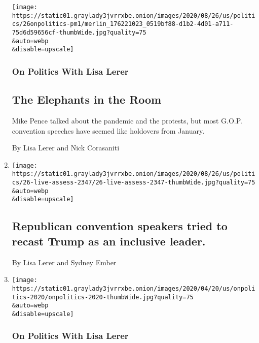 \begin{enumerate}
  \texttt{[image: https://static01.graylady3jvrrxbe.onion/images/2020/08/26/us/politics/26onpolitics-pm1/merlin\_176221023\_0519bf88-d1b2-4d01-a711-75d6d59656cf-thumbWide.jpg?quality=75\\\&auto=webp\\\&disable=upscale]}

  \hypertarget{on-politics-with-lisa-lerer-1}{%
  \subsubsection{On Politics With Lisa
  Lerer}\label{on-politics-with-lisa-lerer-1}}

  \hypertarget{the-elephants-in-the-room}{%
  \subsection{The Elephants in the
  Room}\label{the-elephants-in-the-room}}

  Mike Pence talked about the pandemic and the protests, but most G.O.P.
  convention speeches have seemed like holdovers from January.

  By Lisa Lerer and Nick Corasaniti
\item
  \href{/2020/08/26/us/elections/republican-convention-speakers-tried-to-recast-trump-as-an-inclusive-leader.html}{}

  \texttt{[image: https://static01.graylady3jvrrxbe.onion/images/2020/08/26/us/politics/26-live-assess-2347/26-live-assess-2347-thumbWide.jpg?quality=75\\\&auto=webp\\\&disable=upscale]}

  \hypertarget{republican-convention-speakers-tried-to-recast-trump-as-an-inclusive-leader}{%
  \subsection{Republican convention speakers tried to recast Trump as an
  inclusive
  leader.}\label{republican-convention-speakers-tried-to-recast-trump-as-an-inclusive-leader}}

  By Lisa Lerer and Sydney Ember
\item
  \href{/2020/08/26/us/politics/rnc-convention-coronavirus.html}{}

  \texttt{[image: https://static01.graylady3jvrrxbe.onion/images/2020/04/20/us/onpolitics-2020/onpolitics-2020-thumbWide.jpg?quality=75\\\&auto=webp\\\&disable=upscale]}

  \hypertarget{on-politics-with-lisa-lerer-2}{%
  \subsubsection{On Politics With Lisa
  Lerer}\label{on-politics-with-lisa-lerer-2}}


\end{enumerate}
